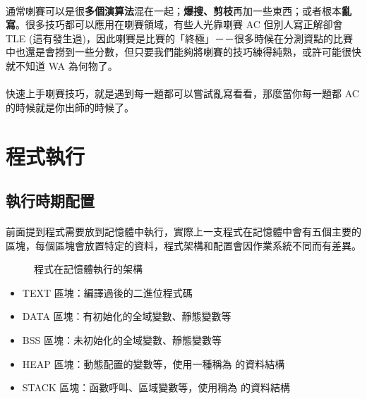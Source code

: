 \documentclass[12pt,a4paper,oneside]{report}
\begin{document}
\begin{CJK}{UTF8}{bkai}
\paragraph{}通常喇賽可以是很\textbf{多個演算法}混在一起；\textbf{爆搜、剪枝}再加一些東西；或者根本\textbf{亂寫}。很多技巧都可以應用在喇賽領域，有些人光靠喇賽 AC 但別人寫正解卻會 TLE (這有發生過)，因此喇賽是比賽的「終極」－－很多時候在分測資點的比賽中也還是會撈到一些分數，但只要我們能夠將喇賽的技巧練得純熟，或許可能很快就不知道 WA 為何物了。
\paragraph{}快速上手喇賽技巧，就是遇到每一題都可以嘗試亂寫看看，那麼當你每一題都 AC 的時候就是你出師的時候了。

\section{程式執行}
\subsection{執行時期配置}

\paragraph{}前面提到程式需要放到記憶體中執行，實際上一支程式在記憶體中會有五個主要的區塊，每個區塊會放置特定的資料，程式架構和配置會因作業系統不同而有差異。

\begin{figure}[h!]
\centering
{}
\caption{程式在記憶體執行的架構}
\label{program:struct:fig:program}
\end{figure}

\begin{itemize}
\item TEXT 區塊：編譯過後的二進位程式碼
\item DATA 區塊：有初始化的全域變數、靜態變數等
\item BSS 區塊：未初始化的全域變數、靜態變數等
\item HEAP 區塊：動態配置的變數等，使用一種稱為 的資料結構
\item STACK 區塊：函數呼叫、區域變數等，使用稱為 的資料結構
\end{itemize}


\end{CJK}
\end{document}
